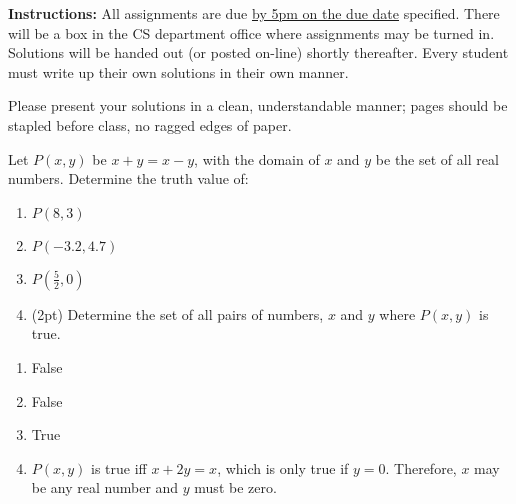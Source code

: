\documentclass[12pt,addpoints]{exam}
\begin{document}
\extrawidth{0.5in} \extrafootheight{-0in} \pagestyle{headandfoot}
\headrule {} \footrule {}

\noindent \textbf{Instructions:} All assignments are due \underline{by 5pm on the due date} specified.  There will be a box in the CS department office where assignments may be turned in.  Solutions will be handed out (or posted on-line) shortly thereafter.  Every student
must write up their own solutions in their own manner.

\smallskip
\noindent Please present your solutions in a clean, understandable
manner; pages should be stapled before class, no ragged edges of
paper.

\begin{questions}
\printanswers

\question[5] Let $P(x,y)$ be $x + y = x - y$, with the domain of $x$ and $y$ be the set of all real numbers.  Determine the truth value of:
\begin{enumerate}[label=(\alph*),itemsep=0pt,parsep=0pt,topsep=0pt,partopsep=0pt]
    \item $P(8,3)$
    \item $P(-3.2, 4.7)$
    \item $P(\frac{5}{2}, 0)$
    \item (2pt) Determine the set of all pairs of numbers, $x$ and $y$ where $P(x,y)$ is true.
\end{enumerate}
    \ifprintanswers
        \vspace{-10pt}
    \fi
\begin{solution}
    \begin{enumerate}[label=(\alph*),itemsep=0pt,parsep=0pt,topsep=0pt,partopsep=0pt]
        \item False
        \item False
        \item True
        \item $P(x,y)$ is true iff $x + 2y = x$, which is only true if $y=0$.  Therefore, $x$ may be any real number and $y$ must be zero.
    \end{enumerate}
\end{solution}



\end{questions}
\end{document}
